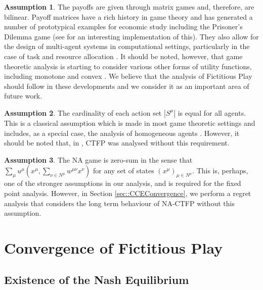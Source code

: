 \documentclass{article}
\theoremstyle{definition}
\newtheorem{assumption}{Assumption}
\newcommand{\actionset}[1]{S^{#1}}
\newcommand{\wmunu}{w^{\mu \nu}}
\newcommand{\xmu}{x^{\mu}}
\newcommand{\xnu}{x^{\nu}}
\newcommand{\weightedsum}{ \sum_{\nu \in N^\mu} \wmunu \xnu}
\begin{document}
  \begin{assumption}\label{ass::matrixgame}
    The payoffs are given through matrix games and, therefore, are bilinear. Payoff matrices
    have a rich history in game theory and has generated a number of prototypical examples for
    economic study including the Prisoner's Dilemma game (see \cite{Axelrod} for an interesting
    implementation of this). They also allow for the design of multi-agent systems in
    computational settings, particularly in the case of task and resource allocation \cite{AGT
    and some of the Applied Game Theory Papers}. It should be noted, however, that game
    theoretic analysis is starting to consider various other forms of utility functions,
    including monotone \cite{Maryam} and convex \cite{Parise}. We believe that the analysis of
    Fictitious Play should follow in these developments and we consider it as an important area
    of future work.
  \end{assumption}

  \begin{assumption}\label{ass::sameactions}
    The cardinality of each action set $|\actionset{\mu}|$ is equal for all agents. This is
    a classical assumption which is made in most game theoretic settings and includes, as a
    special case, the analysis of homogeneous agents \cite{}. However, it should be noted that,
    in \cite{Ewerhart}, CTFP was analysed without this requirement.  
  \end{assumption}

  \begin{assumption}\label{ass::zerosum}
    The NA game is zero-sum in the sense that $\sum_{\mu} u^\mu(\xmu, \weightedsum)$ for any set
    of states $(x^\mu)_{\mu \in N^\mu}$. This is, perhaps, one of the stronger assumptions in
    our analysis, and is required for the fixed point analysis. However, in Section
    \ref{sec::CCEConvergence}, we perform a regret analysis that considers the long term
    behaviour of NA-CTFP without this assumption.
  \end{assumption}

\section{Convergence of Fictitious Play}

  \subsection{Existence of the Nash Equilibrium}
  \label{sec::ExistenceofNE}
  
\end{document}
